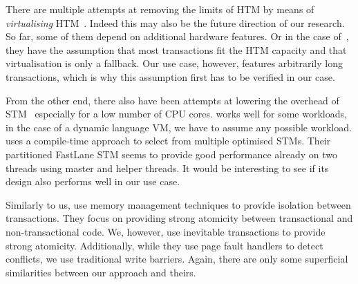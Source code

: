 \documentclass{sigplanconf}
\begin{document}
There are multiple attempts at removing the limits of HTM by means of
\emph{virtualising} HTM~\cite{rajwar05,chung06}. Indeed this may also
be the future direction of our research. So far, some of them depend
on additional hardware features. Or in the case of~\cite{chung06},
they have the assumption that most transactions fit the HTM capacity
and that virtualisation is only a fallback. Our use case, however,
features arbitrarily long transactions, which is why this assumption
first has to be verified in our case.

From the other end, there also have been attempts at lowering the
overhead of STM~\cite{warmhoff13,spear09} especially for a low number
of CPU cores. \cite{spear09} works well for some workloads, in the
case of a dynamic language VM, we have to assume any possible
workload.  \cite{warmhoff13} uses a compile-time approach to select
from multiple optimised STMs. Their partitioned FastLane STM seems to
provide good performance already on two threads using master and
helper threads. It would be interesting to see if its design also
performs well in our use case.

Similarly to us, \cite{martin09} use memory management techniques to
provide isolation between transactions. They focus on providing strong
atomicity between transactional and non-transactional code.  We,
however, use inevitable transactions to provide strong atomicity.
Additionally, while they use page fault handlers to detect conflicts,
we use traditional write barriers. Again, there are only some
superficial similarities between our approach and theirs.



\end{document}
